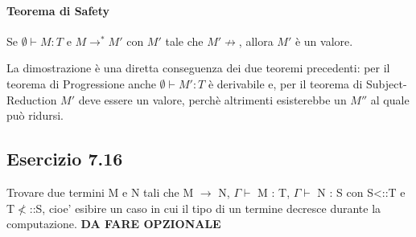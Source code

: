 \paragraph{Teorema di Safety}
\begin{centering}
	Se $\emptyset \vdash M :T$ e $M \to^* M'$ con $M'$ tale che $M' \not\to$, allora $M'$ \`e un valore.
\end{centering}

\noindent La dimostrazione \`e una diretta conseguenza dei due teoremi precedenti: per il teorema di Progressione anche $\emptyset \vdash M': T$ \`e derivabile e, per il teorema di Subject-Reduction $M'$ deve essere un valore, perch\`e altrimenti esisterebbe un $M''$ al quale pu\`o ridursi.


\subsection*{Esercizio 7.16}
Trovare due termini M e N tali che M $\rightarrow$ N, $\Gamma\vdash$ M : T, $\Gamma\vdash$ N : S con S<::T e T$\nless$::S, cioe' esibire un caso in cui il tipo di un termine decresce durante la computazione. 
\textbf{{\color{red} DA FARE OPZIONALE}}